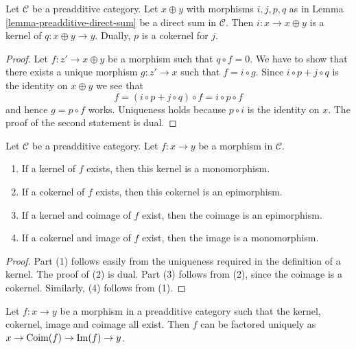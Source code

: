 \begin{lemma}
\label{lemma-additive-cat-biproduct-kernel}
Let $\mathcal{C}$ be a preadditive category.
Let $x \oplus y$ with morphisms $i, j, p, q$
as in
Lemma \ref{lemma-preadditive-direct-sum}
be a direct sum in $\mathcal{C}$. Then $i : x
\to x \oplus y$
is a kernel of $q : x \oplus y \rightarrow
y$. Dually, $p$ is
a cokernel for $j$.
\end{lemma}

\begin{proof}
Let $f : z' \to x \oplus y$ be a morphism
such that $q \circ f = 0$.
We have to show that there exists a unique
morphism $g : z' \to x$
such that $f = i \circ g$. Since $i \circ p +
j \circ q$ is the identity on
$x \oplus y$ we see that
$$
f = (i \circ p + j \circ q) \circ f = i \circ
p \circ f
$$
and hence $g = p \circ f$ works. Uniqueness
holds because $p \circ i$
is the identity on $x$. The proof of the
second statement is dual.
\end{proof}

\begin{lemma}
\label{lemma-kernel-mono}
Let $\mathcal{C}$ be a preadditive category.
Let $f : x \to y$ be a morphism in
$\mathcal{C}$.
\begin{enumerate}
\item If a kernel of $f$ exists, then
this kernel is a monomorphism.
\item If a cokernel of $f$ exists, then
this cokernel is an epimorphism.
\item If a kernel and coimage of $f$ exist,
then
the coimage is an epimorphism.
\item If a cokernel and image of $f$ exist,
then
the image is a monomorphism.
\end{enumerate}
\end{lemma}

\begin{proof}
Part (1) follows easily from the uniqueness
required in the
definition of a kernel. The proof of (2) is
dual.
Part (3) follows from (2), since the coimage
is a cokernel.
Similarly, (4) follows from (1).
\end{proof}

\begin{lemma}
\label{lemma-coim-im-map}
Let $f : x \to y$ be a morphism in a
preadditive category
such that the kernel, cokernel, image and
coimage all exist.
Then $f$ can be factored uniquely as
$x \to \mathop{\mathrm{Coim}}(f) \to \mathop{\mathrm{Im}}(f) \to y$.
\end{lemma}

